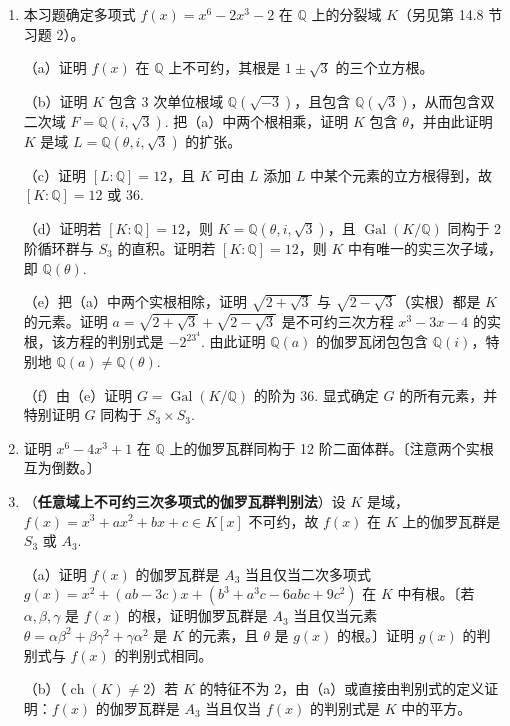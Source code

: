 \begin{enumerate}
\item 本习题确定多项式 \(f(x) = x^6-2x^3-2\) 在 \(\mathbb{Q}\) 上的分裂域 \(K\)（另见第 14.8 节习题 2）。

（a）证明 \(f(x)\) 在 \(\mathbb{Q}\) 上不可约，其根是 \(1\pm\sqrt{3}\) 的三个立方根。

（b）证明 \(K\) 包含 3 次单位根域 \(\mathbb{Q}(\sqrt{-3})\)，且包含 \(\mathbb{Q}(\sqrt{3})\)，从而包含双二次域 \(F = \mathbb{Q}(i, \sqrt{3})\). 把（a）中两个根相乘，证明 \(K\) 包含 \(\theta\)，并由此证明 \(K\) 是域 \(L = \mathbb{Q}(\theta, i, \sqrt{3})\) 的扩张。

（c）证明 \([L:\mathbb{Q}] = 12\)，且 \(K\) 可由 \(L\) 添加 \(L\) 中某个元素的立方根得到，故 \([K:\mathbb{Q}] = 12\) 或 36.

（d）证明若 \([K:\mathbb{Q}] = 12\)，则 \(K = \mathbb{Q}(\theta, i, \sqrt{3})\)，且 \(\operatorname{Gal}(K/\mathbb{Q})\) 同构于 2 阶循环群与 \(S_3\) 的直积。证明若 \([K:\mathbb{Q}] = 12\)，则 \(K\) 中有唯一的实三次子域，即 \(\mathbb{Q}(\theta)\).

（e）把（a）中两个实根相除，证明 \(\sqrt{2+\sqrt{3}}\) 与 \(\sqrt{2-\sqrt{3}}\)（实根）都是 \(K\) 的元素。证明 \(a = \sqrt{2+\sqrt{3}}+\sqrt{2-\sqrt{3}}\) 是不可约三次方程 \(x^3-3x-4\) 的实根，该方程的判别式是 \(-2^23^4\). 由此证明 \(\mathbb{Q}(a)\) 的伽罗瓦闭包包含 \(\mathbb{Q}(i)\)，特别地 \(\mathbb{Q}(a) \neq \mathbb{Q}(\theta)\).

（f）由（e）证明 \(G = \operatorname{Gal}(K/\mathbb{Q})\) 的阶为 36. 显式确定 \(G\) 的所有元素，并特别证明 \(G\) 同构于 \(S_3 \times S_3\).

\item 证明 \(x^6-4x^3+1\) 在 \(\mathbb{Q}\) 上的伽罗瓦群同构于 12 阶二面体群。〔注意两个实根互为倒数。〕

\item （\textbf{任意域上不可约三次多项式的伽罗瓦群判别法}）设 \(K\) 是域，\(f(x) = x^3+ax^2+bx+c \in K[x]\) 不可约，故 \(f(x)\) 在 \(K\) 上的伽罗瓦群是 \(S_3\) 或 \(A_3\).

（a）证明 \(f(x)\) 的伽罗瓦群是 \(A_3\) 当且仅当二次多项式 \(g(x) = x^2+(ab-3c)x+(b^3+a^3c-6abc+9c^2)\) 在 \(K\) 中有根。〔若 \(\alpha, \beta, \gamma\) 是 \(f(x)\) 的根，证明伽罗瓦群是 \(A_3\) 当且仅当元素 \(\theta = \alpha\beta^2+\beta\gamma^2+\gamma\alpha^2\) 是 \(K\) 的元素，且 \(\theta\) 是 \(g(x)\) 的根。〕证明 \(g(x)\) 的判别式与 \(f(x)\) 的判别式相同。

（b）（\(\operatorname{ch}(K) \neq 2\)）若 \(K\) 的特征不为 2，由（a）或直接由判别式的定义证明：\(f(x)\) 的伽罗瓦群是 \(A_3\) 当且仅当 \(f(x)\) 的判别式是 \(K\) 中的平方。


\end{enumerate}
